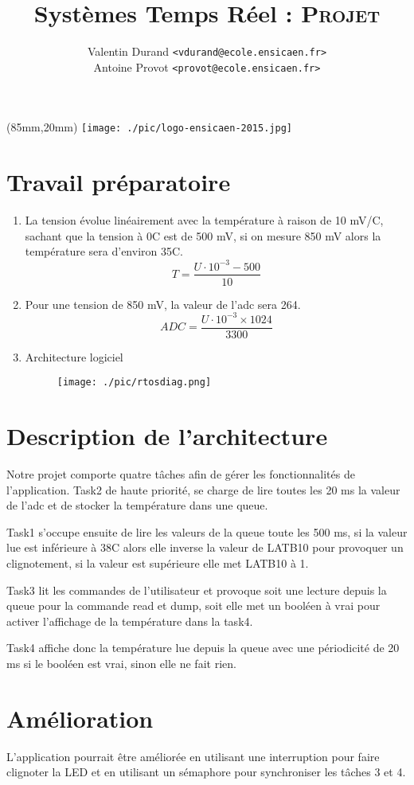 \documentclass[a4paper,11pt,final]{article}
\date{\displaydate{date}}
\title{Systèmes Temps Réel : \textsc{Projet}}
\author{Valentin Durand \texttt{<vdurand@ecole.ensicaen.fr>}\\Antoine Provot \texttt{<provot@ecole.ensicaen.fr>}}
\begin{document}
\begin{textblock*}{3cm}(85mm,20mm) 
	\texttt{[image: ./pic/logo-ensicaen-2015.jpg]} 
\end{textblock*} 

\maketitle

\section*{Travail préparatoire}
\begin{enumerate}
\item La tension évolue linéairement avec la température à raison de 10 mV/\textdegree C, sachant que la tension à 0\textdegree C est de 500 mV, si on mesure 850 mV alors la température sera d'environ 35\textdegree C.
\[T=\frac{U\cdot10^{-3}-500}{10}\]
\item Pour une tension de 850 mV, la valeur de l'adc sera 264.
\[ADC=\frac{U\cdot10^{-3}\times1024}{3300}\]
\item Architecture logiciel
\begin{figure}[!ht]
    \centering
    \texttt{[image: ./pic/rtosdiag.png]}
\end{figure}
\end{enumerate}

\section*{Description de l'architecture}

Notre projet comporte quatre tâches afin de gérer les fonctionnalités de l'application. Task2 de haute priorité, se charge de lire toutes les 20 ms la valeur de l'adc et de stocker la température dans une queue. 

Task1 s'occupe ensuite de lire les valeurs de la queue toute les 500 ms, si la valeur lue est inférieure à 38\textdegree C alors elle inverse la valeur de LATB10 pour provoquer un clignotement, si la valeur est supérieure elle met LATB10 à 1.

Task3 lit les commandes de l'utilisateur et provoque soit une lecture depuis la queue pour la commande read et dump, soit elle met un booléen à vrai pour activer l'affichage de la température dans la task4.

Task4 affiche donc la température lue depuis la queue avec une périodicité de 20 ms si le booléen est vrai, sinon elle ne fait rien.

\section*{Amélioration}

L'application pourrait être améliorée en utilisant une interruption pour faire clignoter la LED et en utilisant un sémaphore pour synchroniser les tâches 3 et 4.
\end{document}
